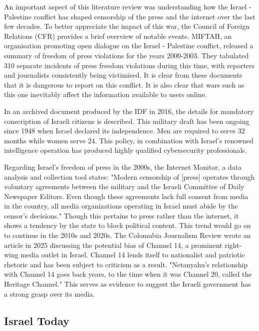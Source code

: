 An important aspect of this literature review was understanding how the Israel - Palestine conflict has shaped censorship of the press and the internet over the last few decades. To better appreciate the impact of this war, the Council of Foreign Relations (CFR) provides a brief overview of notable events. \cite{CFR2024Timeline} MIFTAH, an organisation promoting open dialogue on the Israel - Palestine conflict, released a summary of freedom of press violations for the years 2000-2003. They tabulated 310 separate incidents of press freedom violations during this time, with reporters and journalists consistently being victimised. \cite{Miftah2003Censorship} It is clear from these documents that it is dangerous to report on this conflict. It is also clear that wars such as this one inevitably affect the information available to users online.

In an archived document produced by the IDF in 2016, the details for mandatory conscription of Israeli citizens is described. \cite{MOIA2016IDF} This military draft has been ongoing since 1948 when Israel declared its independence. Men are required to serve 32 months while women serve 24. This policy, in combination with Israel's renowned intelligence operation has produced highly qualified cybersecurity professionals. 

Regarding Israel's freedom of press in the 2000s, the Internet Monitor, a data analysis and collection tool states: "Modern censorship of [press] operates through voluntary agreements between the military and the Israeli Committee of Daily Newspaper Editors. Even though these agreements lack full consent from media in the country, all media organizations operating in Israel must abide by the censor's decisions." \cite{internet_monitor_israel} Though this pertains to press rather than the internet, it shows a tendency by the state to block political content. This trend would go on to continue in the 2010s and 2020s. The Colomubia Journalism Review wrote an article in 2025 discussing the potential bias of Channel 14, a prominent right-wing media outlet in Israel. Channel 14 lends itself to nationalist and patriotic rhetoric and has been subject to criticism as a result. "Netanyahu’s relationship with Channel 14 goes back years, to the time when it was Channel 20, called the Heritage Channel." \cite{CJR2024IsraelChannel14} This serves as evidence to suggest the Israeli government has a strong grasp over its media. 

\subsection{Israel Today}


